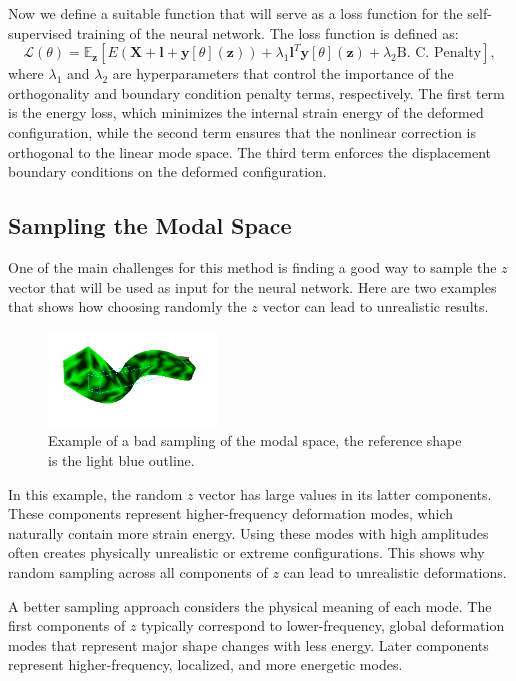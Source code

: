 Now we define a suitable function that will serve as a loss function for the self-supervised training of the neural network. The loss function is defined as:
\begin{equation}
    \mathcal{L}(\theta) = \mathbb{E}_{\bm{z}} \left[ E(\bm{X} + \bm{l} + \bm{y}[\theta](\bm{z})) + \lambda_1 \bm{l}^T \bm{y}[\theta](\bm{z}) + \lambda_2 \text{B. C. Penalty} \right],
\end{equation}
where \( \lambda_1 \) and \( \lambda_2 \) are hyperparameters that control the importance of the orthogonality and boundary condition penalty terms, respectively. The first term is the energy loss, which minimizes the internal strain energy of the deformed configuration, while the second term ensures that the nonlinear correction is orthogonal to the linear mode space. The third term enforces the displacement boundary conditions on the deformed configuration.

\subsection{Sampling the Modal Space}
\label{sec:sampling_modal_space}
One of the main challenges for this method is finding a good way to sample the \(z\) vector that will be used as input for the neural network. Here are two examples that shows how choosing randomly the \(z\) vector can lead to unrealistic results. 
\begin{figure}[H]
    \centering
    \includegraphics[width=0.4\textwidth]{Images/z_random.png}
    \caption{Example of a bad sampling of the modal space, the reference shape is the light blue outline.}
    \label{fig:bad_sampling}
\end{figure}
In this example, the random \(z\) vector has large values in its latter components. These components represent higher-frequency deformation modes, which naturally contain more strain energy. Using these modes with high amplitudes often creates physically unrealistic or extreme configurations. This shows why random sampling across all components of \(z\) can lead to unrealistic deformations.

A better sampling approach considers the physical meaning of each mode. The first components of \(z\) typically correspond to lower-frequency, global deformation modes that represent major shape changes with less energy. Later components represent higher-frequency, localized, and more energetic modes. 

